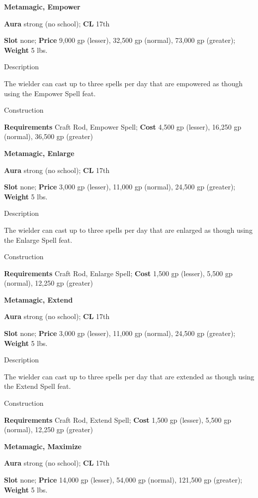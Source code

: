 \textbf{Metamagic, Empower}
				
\textbf{Aura} strong (no school);\textbf{ CL }17th
				
\textbf{Slot} none; \textbf{Price} 9,000 gp (lesser), 32,500 gp (normal), 73,000 gp (greater); \textbf{Weight} 5 lbs.
				
Description
				
The wielder can cast up to three spells per day that are empowered as though using the Empower Spell feat. 
				
Construction
				
\textbf{Requirements} Craft Rod, Empower Spell; \textbf{Cost }4,500 gp (lesser), 16,250 gp (normal), 36,500 gp (greater)
				
\textbf{Metamagic, Enlarge}
				
\textbf{Aura} strong (no school);\textbf{ CL }17th
				
\textbf{Slot} none; \textbf{Price} 3,000 gp (lesser), 11,000 gp (normal), 24,500 gp (greater); \textbf{Weight} 5 lbs.
				
Description
				
The wielder can cast up to three spells per day that 
are enlarged
 as though using the Enlarge Spell feat. 
				
Construction
				
\textbf{Requirements} Craft Rod, Enlarge Spell; \textbf{Cost }1,500 gp (lesser), 5,500 gp (normal), 12,250 gp (greater)
				
\textbf{Metamagic, Extend}
				
\textbf{Aura} strong (no school);\textbf{ CL }17th
				
\textbf{Slot} none; \textbf{Price} 3,000 gp (lesser), 11,000 gp (normal), 24,500 gp (greater); \textbf{Weight} 5 lbs.
				
Description
				
The wielder can cast up to three spells per day that 
are extended
 as though using the Extend Spell feat. 
				
Construction
				
\textbf{Requirements} Craft Rod, Extend Spell; \textbf{Cost }1,500 gp (lesser), 5,500 gp (normal), 12,250 gp (greater)
				
\textbf{Metamagic, Maximize}
				
\textbf{Aura} strong (no school);\textbf{ CL }17th
				
\textbf{Slot} none; \textbf{Price} 14,000 gp (lesser), 54,000 gp (normal), 121,500 gp (greater); \textbf{Weight} 5 lbs.
				
